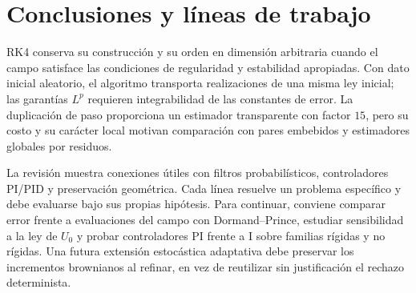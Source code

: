 \documentclass[11pt,a4paper]{article}
\theoremstyle{definition}\newtheorem{definition}[theorem]{Definición}
\theoremstyle{remark}\newtheorem{remark}[theorem]{Observación}
\begin{document}
\section{Conclusiones y líneas de trabajo}
RK4 conserva su construcción y su orden en dimensión arbitraria cuando
el campo satisface las condiciones de regularidad y estabilidad apropiadas.
Con dato inicial aleatorio, el algoritmo transporta realizaciones de una
misma ley inicial; las garantías $L^p$ requieren integrabilidad de las
constantes de error. La duplicación de paso proporciona un estimador
transparente con factor $15$, pero su costo y su carácter local motivan
comparación con pares embebidos y estimadores globales por residuos.

La revisión muestra conexiones útiles con filtros probabilísticos,
controladores PI/PID y preservación geométrica. Cada línea resuelve un
problema específico y debe evaluarse bajo sus propias hipótesis. Para
continuar, conviene comparar error frente a evaluaciones del campo con
Dormand--Prince, estudiar sensibilidad a la ley de $U_0$ y probar
controladores PI frente a I sobre familias rígidas y no rígidas. Una futura
extensión estocástica adaptativa debe preservar los incrementos brownianos
al refinar, en vez de reutilizar sin justificación el rechazo determinista.
\end{document}
